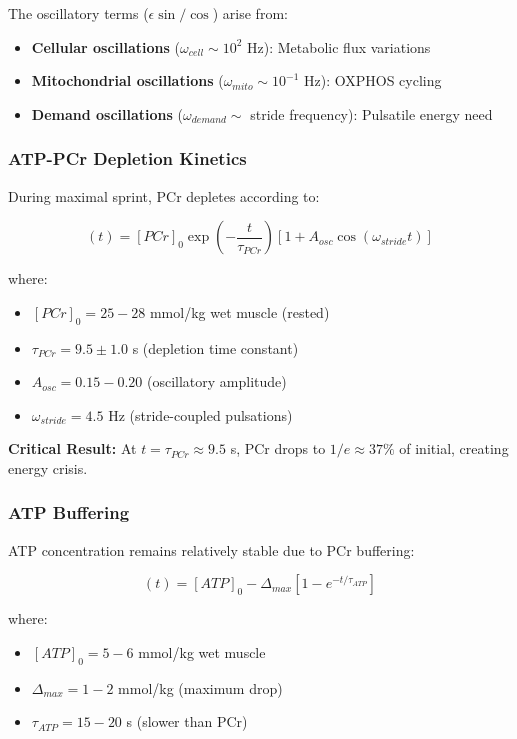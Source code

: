 The oscillatory terms ($\epsilon \sin/\cos$) arise from:
\begin{itemize}
\item \textbf{Cellular oscillations} ($\omega_{cell} \sim 10^2$ Hz): Metabolic flux variations
\item \textbf{Mitochondrial oscillations} ($\omega_{mito} \sim 10^{-1}$ Hz): OXPHOS cycling
\item \textbf{Demand oscillations} ($\omega_{demand} \sim$ stride frequency): Pulsatile energy need
\end{itemize}

\subsubsection{ATP-PCr Depletion Kinetics}

During maximal sprint, PCr depletes according to:

\begin{equation}
[PCr](t) = [PCr]_0 \exp\left(-\frac{t}{\tau_{PCr}}\right) \left[1 + A_{osc} \cos(\omega_{stride} t)\right]
\label{eq:pcr_depletion}
\end{equation}

where:
\begin{itemize}
\item $[PCr]_0 = 25-28$ mmol/kg wet muscle (rested)
\item $\tau_{PCr} = 9.5 \pm 1.0$ s (depletion time constant)
\item $A_{osc} = 0.15-0.20$ (oscillatory amplitude)
\item $\omega_{stride} = 4.5$ Hz (stride-coupled pulsations)
\end{itemize}

\textbf{Critical Result:} At $t = \tau_{PCr} \approx 9.5$ s, PCr drops to $1/e \approx 37\%$ of initial, creating energy crisis.

\subsubsection{ATP Buffering}

ATP concentration remains relatively stable due to PCr buffering:

\begin{equation}
[ATP](t) = [ATP]_0 - \Delta_{max} \left[1 - e^{-t/\tau_{ATP}}\right]
\label{eq:atp_buffering}
\end{equation}

where:
\begin{itemize}
\item $[ATP]_0 = 5-6$ mmol/kg wet muscle
\item $\Delta_{max} = 1-2$ mmol/kg (maximum drop)
\item $\tau_{ATP} = 15-20$ s (slower than PCr)
\end{itemize}

